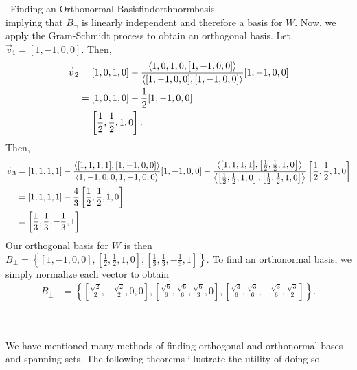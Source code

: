 \begin{example}{\Difficulty\,\Difficulty\,\,Finding an Orthonormal Basis}{findorthnormbasis}
\begin{equation*}
            \end{equation*}
            implying that \(B_\neg\) is linearly independent and therefore a basis for \(W\). Now, we apply the Gram-Schmidt process to obtain an orthogonal basis. Let \(\vec{v}_1=[1,-1,0,0]\). Then,
            \begin{align*}
                \overset{_{\rightharpoonup}}{v}_2&=[1,0,1,0]-\frac{\left\langle 1,0,1,0,[1,-1,0,0]\right\rangle}{\left\langle [1,-1,0,0],[1,-1,0,0]\right\rangle}[1,-1,0,0] \\
                &=[1,0,1,0]-\frac{1}{2}[1,-1,0,0] \\
                &=\left[\frac{1}{2},\frac{1}{2},1,0\right].
            \end{align*}
            Then,
            \begin{align*}
                \overset{_{\rightharpoonup}}{v}_3&=[1,1,1,1]-\frac{\left\langle [1,1,1,1],[1,-1,0,0]\right\rangle}{\left\langle 1,-1,0,0,1,-1,0,0\right\rangle}[1,-1,0,0]-\frac{\left\langle [1,1,1,1],\left[\frac{1}{2},\frac{1}{2},1,0\right]\right\rangle}{\left\langle \left[\frac{1}{2},\frac{1}{2},1,0\right],\left[\frac{1}{2},\frac{1}{2},1,0\right]\right\rangle}\left[\frac{1}{2},\frac{1}{2},1,0\right] \\
                &=[1,1,1,1]-\frac{4}{3}\left[\frac{1}{2},\frac{1}{2},1,0\right] \\
                &=\left[\frac{1}{3},\frac{1}{3},-\frac{1}{3},1\right].
            \end{align*}
            Our orthogonal basis for \(W\) is then \(B_\perp=\left\{[1,-1,0,0],\left[\frac{1}{2},\frac{1}{2},1,0\right],\left[\frac{1}{3},\frac{1}{3},-\frac{1}{3},1\right]\right\}\). To find an orthonormal basis, we simply normalize each vector to obtain
            \begin{align*}
                B_{\hat{\perp}}&=\left\{\left[\frac{\sqrt{2}}{2},-\frac{\sqrt{2}}{2},0,0\right],\left[\frac{\sqrt{6}}{6},\frac{\sqrt{6}}{6},\frac{\sqrt{6}}{3},0\right],\left[\frac{\sqrt{3}}{6},\frac{\sqrt{3}}{6},-\frac{\sqrt{3}}{6},\frac{\sqrt{3}}{2}\right]\right\}.
            \end{align*}
        \end{example}
        \pagebreak
        \vphantom
        \\
        \\
        We have mentioned many methods of finding orthogonal and orthonormal bases and spanning sets. The following theorems illustrate the utility of doing so.
